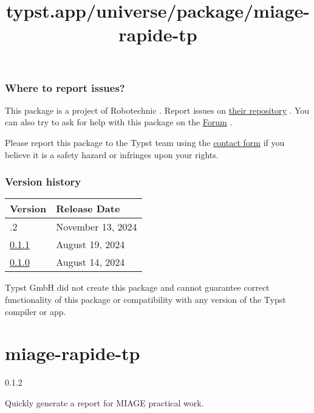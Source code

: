 \subsubsection{Where to report issues?}\label{where-to-report-issues}

This package is a project of Robotechnic . Report issues on
\href{https://github.com/Robotechnic/alchemist}{their repository} . You
can also try to ask for help with this package on the
\href{https://forum.typst.app}{Forum} .

Please report this package to the Typst team using the
\href{https://typst.app/contact}{contact form} if you believe it is a
safety hazard or infringes upon your rights.

\label{versions}
\subsubsection{Version history}\label{version-history}

\begin{longtable}[]{@{}ll@{}}
\toprule\noalign{}
Version & Release Date \\
\midrule\noalign{}
\endhead
\bottomrule\noalign{}
\endlastfoot
0.1.2 & November 13, 2024 \\
\href{https://typst.app/universe/package/alchemist/0.1.1/}{0.1.1} &
August 19, 2024 \\
\href{https://typst.app/universe/package/alchemist/0.1.0/}{0.1.0} &
August 14, 2024 \\
\end{longtable}

Typst GmbH did not create this package and cannot guarantee correct
functionality of this package or compatibility with any version of the
Typst compiler or app.


\title{typst.app/universe/package/miage-rapide-tp}

\label{banner}
\label{template-thumbnail}

\section{miage-rapide-tp}\label{miage-rapide-tp}

{ 0.1.2 }

Quickly generate a report for MIAGE practical work.

